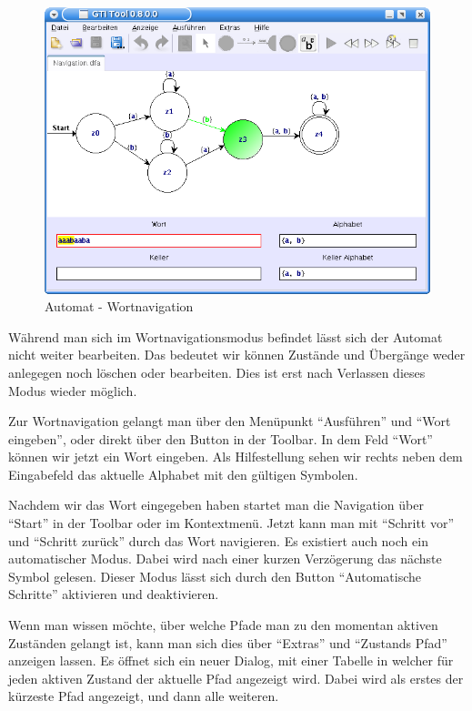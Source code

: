     
\begin{figure}[h]
\begin{center}
\includegraphics[width=12cm]{images/dfa_navigation.png}
\caption{Automat - Wortnavigation}
\end{center}
\end{figure}
  
  Während man sich im Wortnavigationsmodus befindet lässt sich der Automat nicht
  weiter bearbeiten. Das bedeutet wir können Zustände und Übergänge weder
  anlegegen noch löschen oder bearbeiten. Dies ist erst nach Verlassen dieses
  Modus wieder möglich.\vspace{10pt}
  
  Zur Wortnavigation gelangt man über den Menüpunkt "`Ausführen"' und "`Wort
  eingeben"', oder direkt über den Button in der Toolbar. In dem Feld
  "`Wort"' können wir jetzt ein Wort eingeben. Als Hilfestellung sehen
  wir rechts neben dem Eingabefeld das aktuelle Alphabet mit den gültigen
  Symbolen.\vspace{10pt}
  
  Nachdem wir das Wort eingegeben haben startet man die Navigation über "`Start"'
  in der Toolbar oder im Kontextmenü. Jetzt kann man mit "`Schritt vor"' und
  "`Schritt zurück"' durch das Wort navigieren. Es existiert auch noch ein
  automatischer Modus. Dabei wird nach einer kurzen Verzögerung das nächste
  Symbol gelesen. Dieser Modus lässt sich durch den Button "`Automatische
  Schritte"' aktivieren und deaktivieren.\vspace{10pt}

  Wenn man wissen möchte, über welche Pfade man zu den momentan aktiven Zuständen
  gelangt ist, kann man sich dies über "`Extras"' und "`Zustands Pfad"' anzeigen
  lassen. Es öffnet sich ein neuer Dialog, mit einer Tabelle in welcher für jeden
  aktiven Zustand der aktuelle Pfad angezeigt wird. Dabei wird als erstes der
  kürzeste Pfad angezeigt, und dann alle weiteren.\vspace{10pt}
  
